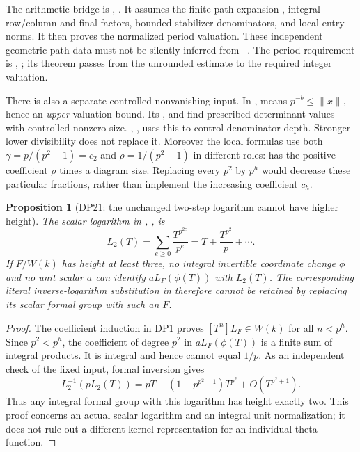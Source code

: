 \documentclass[11pt,a4paper]{article}
\newtheorem{proposition}[theorem]{Proposition}
\theoremstyle{definition}\newtheorem{remark}[theorem]{Remark}
\begin{document}
The arithmetic bridge is , . It assumes the finite path expansion , integral row/column and final factors, bounded stabilizer denominators, and local entry norms. It then proves the normalized period valuation. These independent geometric path data must not be silently inferred from --. The period requirement is , ; its theorem  passes from the unrounded estimate to the required integer valuation.

There is also a separate controlled-nonvanishing input. In ,  means $p^{-b}\le\lVert x\rVert$, hence an \emph{upper} valuation bound. Its ,  and  find prescribed determinant values with controlled nonzero size. , , uses this to control denominator depth. Stronger lower divisibility does not replace it. Moreover the local formulas use both $\gamma=p/(p^2-1)=c_2$ and $\rho=1/(p^2-1)$ in different roles:  has the positive coefficient $\rho$ times a diagram size. Replacing every $p^2$ by $p^h$ would decrease these particular fractions, rather than implement the increasing coefficient $c_h$.

\begin{proposition}[DP21: the unchanged two-step logarithm cannot have higher height]\label{DP21}
The scalar logarithm in , , is
\[
 L_2(T)=\sum_{e\ge0}\frac{T^{p^{2e}}}{p^e}
 =T+\frac{T^{p^2}}p+\cdots.
\]
If $F/W(k)$ has height at least three, no integral invertible coordinate change $\phi$ and no unit scalar $a$ can identify $aL_F(\phi(T))$ with $L_2(T)$. The corresponding literal inverse-logarithm substitution in  therefore cannot be retained by replacing its scalar formal group with such an $F$.
\end{proposition}
\begin{proof}
The coefficient induction in DP1 proves $[T^n]L_F\in W(k)$ for all $n<p^h$. Since $p^2<p^h$, the coefficient of degree $p^2$ in $aL_F(\phi(T))$ is a finite sum of integral products. It is integral and hence cannot equal $1/p$. As an independent check of the fixed input, formal inversion gives
\[
 L_2^{-1}(pL_2(T))
 =pT+(1-p^{p^2-1})T^{p^2}+O(T^{p^2+1}).
\]
Thus any integral formal group with this logarithm has height exactly two. This proof concerns an actual scalar logarithm and an integral unit normalization; it does not rule out a different kernel representation for an individual theta function.
\end{proof}
\end{document}
